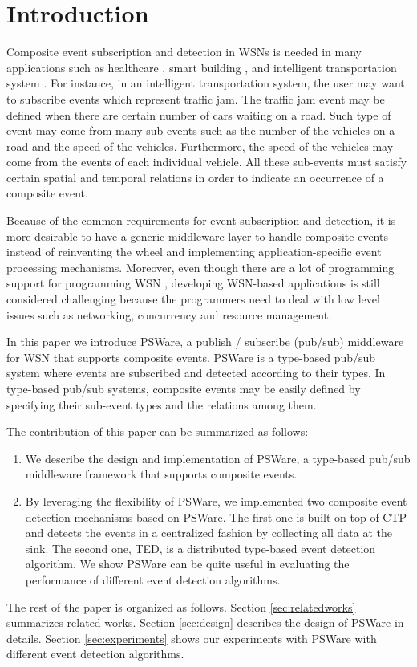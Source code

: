 \section{Introduction}
\label{sec:introduction}
Composite event subscription and detection \cite{jector} in WSNs is needed in many applications such as healthcare \cite{lo:ban}, smart building \cite{lynch:shm}, and intelligent transportation system \cite{klein:its}. For instance, in an intelligent transportation system, the user may want to subscribe events which represent traffic jam. The traffic jam event may be defined when there are certain number of cars waiting on a road. Such type of event may come from many sub-events such as the number of the vehicles on a road and the speed of the vehicles. Furthermore, the speed of the vehicles may come from the events of each individual vehicle. All these sub-events must satisfy certain spatial and temporal relations in order to indicate an occurrence of a composite event.

Because of the common requirements for event subscription and detection, it is more desirable to have a generic middleware layer to handle composite events instead of reinventing the wheel and implementing application-specific event processing mechanisms. Moreover, even though there are a lot of programming support for programming WSN \cite{nesc}, developing WSN-based applications is still considered challenging because the programmers need to deal with low level issues such as networking, concurrency and resource management. 

In this paper we introduce PSWare, a publish / subscribe (pub/sub) middleware for WSN that supports composite events. PSWare is a type-based pub/sub system where events are subscribed and detected according to their types. In type-based pub/sub systems, composite events may be easily defined by specifying their sub-event types and the relations among them.

The contribution of this paper can be summarized as follows:
\begin{enumerate}
  \item We describe the design and implementation of PSWare, a type-based pub/sub middleware framework that supports composite events.
  \item By leveraging the flexibility of PSWare, we implemented two composite event detection mechanisms based on PSWare. The first one is built on top of CTP and detects the events in a centralized fashion by collecting all data at the sink. The second one, TED, is a distributed type-based event detection algorithm. We show PSWare can be quite useful in evaluating the performance of different event detection algorithms.
\end{enumerate}

The rest of the paper is organized as follows. Section \ref{sec:relatedworks} summarizes related works. Section \ref{sec:design} describes the design of PSWare in details. Section \ref{sec:experiments} shows our experiments with PSWare with different event detection algorithms.
